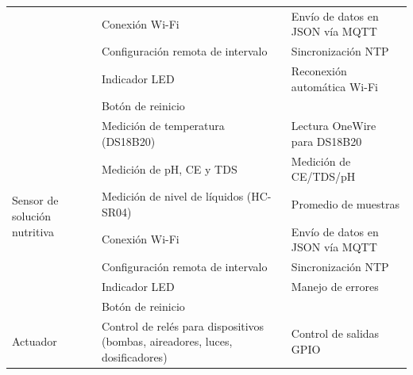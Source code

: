 \begin{table}[H]
\begin{tabular}{p{1.5cm}p{5.4cm}p{5.5cm}}
                                                          & Conexión Wi-Fi                                                                & Envío de datos en JSON vía MQTT                \\
                                                          & Configuración remota de intervalo                                             & Sincronización NTP                             \\
                                                          & Indicador LED                                                                 & Reconexión automática Wi-Fi                    \\
                                                          & Botón de reinicio                                                             &                                                \\
        \hline
        \multirow{7}{1.5cm}{Sensor de solución nutritiva} & Medición de temperatura (DS18B20)                                             & Lectura OneWire para DS18B20                   \\
                                                          & Medición de pH, CE y TDS                                                      & Medición de CE/TDS/pH                          \\
                                                          & Medición de nivel de líquidos (HC-SR04)                                       & Promedio de muestras                           \\
                                                          & Conexión Wi-Fi                                                                & Envío de datos en JSON vía MQTT                \\
                                                          & Configuración remota de intervalo                                             & Sincronización NTP                             \\
                                                          & Indicador LED                                                                 & Manejo de errores                              \\
                                                          & Botón de reinicio                                                             &                                                \\
        \hline
        \multirow{7}{1.5cm}{Actuador}                     & Control de relés para dispositivos (bombas, aireadores, luces, dosificadores) & Control de salidas GPIO                        \\

\end{tabular}
\end{table}
